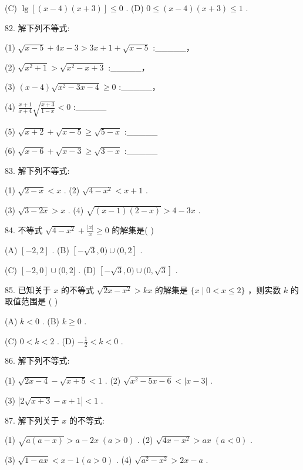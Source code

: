 \documentclass[10pt]{article}
\begin{document}
(C) \(\lg \left\lbrack  {\left( {x - 4}\right) \left( {x + 3}\right) }\right\rbrack   \leq  0\) . (D) \(0 \leq  \left( {x - 4}\right) \left( {x + 3}\right)  \leq  1\) .

82. 解下列不等式:

(1) \(\sqrt{x - 5} + {4x} - 3 > {3x} + 1 + \sqrt{x - 5}\) :\_\_\_\_\_，

(2) \(\sqrt{{x}^{2} + 1} > \sqrt{{x}^{2} - x + 3}\) :\_\_\_\_\_，

(3) \(\left( {x - 4}\right) \sqrt{{x}^{2} - {3x} - 4} \geq  0\) :\_\_\_\_\_，

(4) \(\frac{x + 1}{x + 4}\sqrt{\frac{x + 3}{1 - x}} < 0\) :\_\_\_\_\_

(5) \(\sqrt{x + 2} + \sqrt{x - 5} \geq  \sqrt{5 - x}\) :\_\_\_\_\_

(6) \(\sqrt{x - 6} + \sqrt{x - 3} \geq  \sqrt{3 - x}\) :\_\_\_\_\_

83. 解下列不等式:

(1) \(\sqrt{2 - x} < x\) . (2) \(\sqrt{4 - {x}^{2}} < x + 1\) .

(3) \(\sqrt{3 - {2x}} > x\) . (4) \(\sqrt{\left( {x - 1}\right) \left( {2 - x}\right) } > 4 - {3x}\) .

84. 不等式 \(\sqrt{4 - {x}^{2}} + \frac{\left| x\right| }{x} \geq  0\) 的解集是( )

(A) \(\left\lbrack  {-2,2}\right\rbrack\) . (B) \(\left\lbrack  {-\sqrt{3},0)\cup (0,2}\right\rbrack\) .

(C) \(\left\lbrack  {-2,0}\right\rbrack   \cup  (0,2\rbrack\) . (D) \(\left\lbrack  {-\sqrt{3},0)\cup (0,\sqrt{3}}\right\rbrack\) .

85. 已知关于 \(x\) 的不等式 \(\sqrt{{2x} - {x}^{2}} > {kx}\) 的解集是 \(\{ x \mid  0 < x \leq  2\}\) ，则实数 \(k\) 的取值范围是 ( )

(A) \(k < 0\) . (B) \(k \geq  0\) .

(C) \(0 < k < 2\) . (D) \(- \frac{1}{2} < k < 0\) .

86. 解下列不等式:

(1) \(\sqrt{{2x} - 4} - \sqrt{x + 5} < 1\) . (2) \(\sqrt{{x}^{2} - {5x} - 6} < \left| {x - 3}\right|\) .

(3) \(\left| {2\sqrt{x + 3} - x + 1}\right|  < 1\) .

87. 解下列关于 \(x\) 的不等式:

(1) \(\sqrt{a\left( {a - x}\right) } > a - {2x}\;\left( {a > 0}\right)\) . (2) \(\sqrt{{4x} - {x}^{2}} > {ax}\;\left( {a < 0}\right)\) .

(3) \(\sqrt{1 - {ax}} < x - 1\left( {a > 0}\right)\) . (4) \(\sqrt{{a}^{2} - {x}^{2}} > {2x} - a\) .
\end{document}
